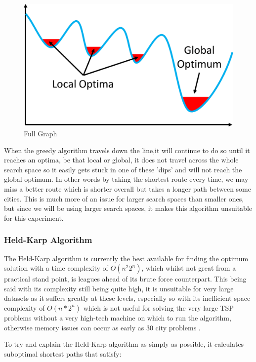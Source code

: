 \documentclass[11pt,a4paper,titlepage]{article}
\begin{document}
\begin{figure}[ht]
	\includegraphics[scale=0.3]{LocalGlobalOptima}
	\centering
	\caption{Full Graph}
\end{figure}

When the greedy algorithm travels down the line,it will continue to do so until it reaches an optima, be that local or global, it does not travel across the whole search space so it easily gets stuck in one of these 'dips' and will not reach the global optimum. In other words by taking the shortest route every time, we may miss a better route which is shorter overall but takes a longer path between some cities. This is much more of an issue for larger search spaces than smaller ones, but since we will be using larger search spaces, it makes this algorithm unsuitable for this experiment.

\subsubsection{Held-Karp Algorithm}
The Held-Karp algorithm is currently the best available for finding the optimum solution with a time complexity of $O(n^2 2^n)$, which whilst not great from a practical stand point, is leagues ahead of its brute force counterpart. This being said with its complexity still being quite high, it is unsuitable for very large datasets as it suffers greatly at these levels, especially so with its inefficient space complexity of $O(n*2^n)$ which is not useful for solving the very large TSP problems without a very high-tech machine on which to run the algorithm, otherwise memory issues can occur as early as 30 city problems \cite{HeldKarpAlg}.

To try and explain the Held-Karp algorithm as simply as possible, it calculates suboptimal shortest paths that satisfy:
\end{document}
